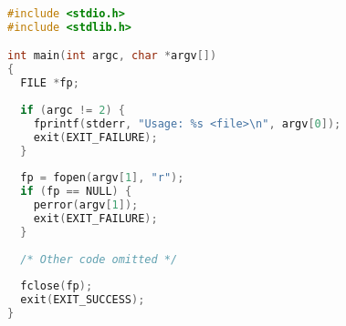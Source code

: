 

\begin{lstlisting}[float, language=C, caption=A small C program, label=lst:smallcprogram]
#include <stdio.h>
#include <stdlib.h>

int main(int argc, char *argv[])
{
  FILE *fp;
  
  if (argc != 2) {
    fprintf(stderr, "Usage: %s <file>\n", argv[0]);
    exit(EXIT_FAILURE);
  }
  
  fp = fopen(argv[1], "r");
  if (fp == NULL) {
    perror(argv[1]);
    exit(EXIT_FAILURE);
  }
  
  /* Other code omitted */
  
  fclose(fp);
  exit(EXIT_SUCCESS);
}
\end{lstlisting}


